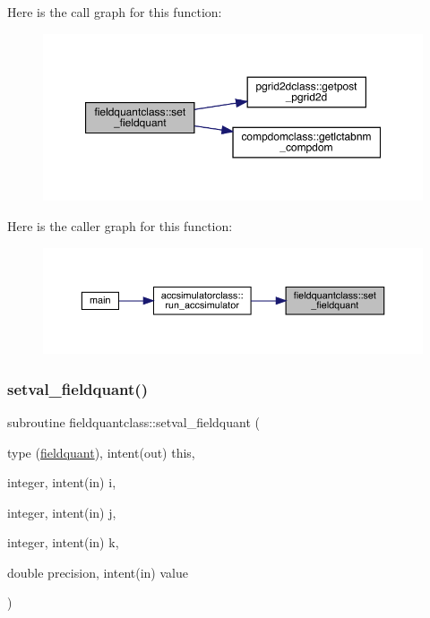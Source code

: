 Here is the call graph for this function\+:\nopagebreak
\begin{figure}[H]
\begin{center}
\leavevmode
\includegraphics[width=350pt]{namespacefieldquantclass_a2d6cd3fb8b4d962adbd4206a5fbd13ce_cgraph}
\end{center}
\end{figure}
Here is the caller graph for this function\+:\nopagebreak
\begin{figure}[H]
\begin{center}
\leavevmode
\includegraphics[width=350pt]{namespacefieldquantclass_a2d6cd3fb8b4d962adbd4206a5fbd13ce_icgraph}
\end{center}
\end{figure}
\mbox{\label{namespacefieldquantclass_a05318a0c571b3210e31af48028673474}} 
\subsubsection{\texorpdfstring{setval\_fieldquant()}{setval\_fieldquant()}}
{\footnotesize\ttfamily subroutine fieldquantclass\+::setval\+\_\+fieldquant (\begin{DoxyParamCaption}\item[{type (\mbox{\hyperlink{namespacefieldquantclass_structfieldquantclass_1_1fieldquant}{fieldquant}}), intent(out)}]{this,  }\item[{integer, intent(in)}]{i,  }\item[{integer, intent(in)}]{j,  }\item[{integer, intent(in)}]{k,  }\item[{double precision, intent(in)}]{value }\end{DoxyParamCaption})}

